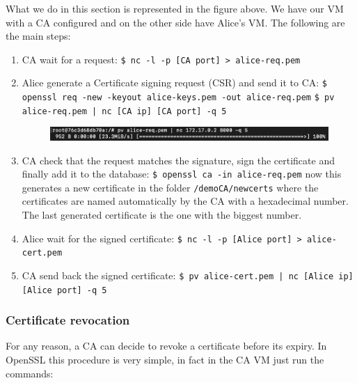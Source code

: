 \documentclass[11pt]{article}
\begin{document}
What we do in this section is represented in the figure above. We have our VM with a CA configured and on the other side have Alice's VM. The following are the main steps:
\begin{enumerate}
 \item CA wait for a request:\newline
 \texttt{\$ nc -l -p [CA port] > alice-req.pem}

 \item Alice generate a Certificate signing request (CSR) and send it to CA:\newline
 \texttt{\$ openssl req -new -keyout alice-keys.pem -out alice-req.pem}\newline
 \texttt{\$ pv alice-req.pem | nc [CA ip] [CA port] -q 5}

 \begin{figure}[!ht]
 \includegraphics[width=1\textwidth]{pic6-hw6-7-1635747}
 \label{fig:pv result}
 \end{figure}

 \item CA check that the request matches the signature, sign the certificate and finally add it to the database:\newline
 \texttt{\$ openssl ca -in alice-req.pem}\newline
 now this generates a new certificate in the folder \texttt{/demoCA/newcerts} where the certificates are named automatically by the CA with a hexadecimal number. The last generated certificate is the one with the biggest number.

 \item Alice wait for the signed certificate:\newline
 \texttt{\$ nc -l -p [Alice port] > alice-cert.pem}

 \item CA send back the signed certificate:\newline
 \texttt{\$ pv alice-cert.pem | nc [Alice ip] [Alice port] -q 5}
\end{enumerate}

\subsubsection{Certificate revocation}
For any reason, a CA can decide to revoke a certificate before its expiry. In OpenSSL this procedure is very simple, in fact in the CA VM just run the commands:
\end{document}
